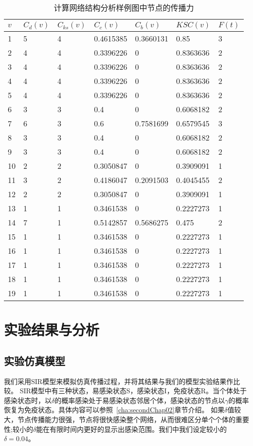 \begin{table}[htbp]
\begin{minipage}[t]{0.8\linewidth}
\caption{计算网络结构分析样例图中节点的传播力}
\label{tab:chap3:exmapleTable}
\begin{tabular}{*{7}{p{}}}
	\toprule[1.5pt]
	{$v$} & {$C_d(v)$} & {$C_{ks}(v)$} & {$C_c(v)$} & {$C_b(v)$} & {$KSC(v)$} & {$F(t)$} \\ 
	\midrule[1pt]
	1 & 5 & 4 & 0.4615385 & 0.3660131 & 0.85 & 3 \\
	2 & 4 & 4 & 0.3396226 & 0 & 0.8363636 & 2 \\
	3 & 4 & 4 & 0.3396226 & 0 & 0.8363636 & 2 \\
	4 & 4 & 4 & 0.3396226 & 0 & 0.8363636 & 2 \\
	5 & 4 & 4 & 0.3396226 & 0 & 0.8363636 & 2 \\
	6 & 3 & 3 & 0.4 & 0 & 0.6068182 & 2 \\
	7 & 6 & 3 & 0.6 & 0.7581699 & 0.6579545 & 3 \\
	8 & 3 & 3 & 0.4 & 0 & 0.6068182 & 2 \\
	9 & 3 & 3 & 0.4 & 0 & 0.6068182 & 2 \\
	10 & 2 & 2 & 0.3050847 & 0 & 0.3909091 & 1 \\
	11 & 3 & 2 & 0.4186047 & 0.2091503 & 0.4045455 & 2 \\
	12 & 2 & 2 & 0.3050847 & 0 & 0.3909091 & 1 \\
	13 & 1 & 1 & 0.3461538 & 0 & 0.2227273 & 1 \\
	14 & 7 & 1 & 0.5142857 & 0.5686275 & 0.475 & 2 \\
	15 & 1 & 1 & 0.3461538 & 0 & 0.2227273 & 1 \\
	16 & 1 & 1 & 0.3461538 & 0 & 0.2227273 & 1 \\
	17 & 1 & 1 & 0.3461538 & 0 & 0.2227273 & 1 \\
	18 & 1 & 1 & 0.3461538 & 0 & 0.2227273 & 1 \\
	19 & 1 & 1 & 0.3461538 & 0 & 0.2227273 & 1 \\
	\bottomrule[1.5pt]
\end{tabular}
\end{minipage}
\end{table}

\section{实验结果与分析}
\subsection{实验仿真模型}
我们采用SIR模型\cite{kermack1927contribution,diekmann1990definition,hethcote2000mathematics,bernoulli2004attempt}来模拟仿真传播过程，并将其结果与我们的模型实验结果作比较。
SIR模型中有三种状态，易感染状态S，感染状态I，免疫状态R。当个体处于感染状态时，以$\delta$的概率感染处于易感染状态邻居个体，感染状态的节点以$\gamma$的概率恢复为免疫状态。具体内容可以参照~\ref{cha:secondChap02}章节介绍。
如果$\delta$值较大，节点传播能力很强，节点将很快感染整个网络，从而很难区分单个个体的重要性;较小的$\delta$能在有限时间内更好的显示出感染范围。我们中我们设定较小的$\delta =0.04$。
